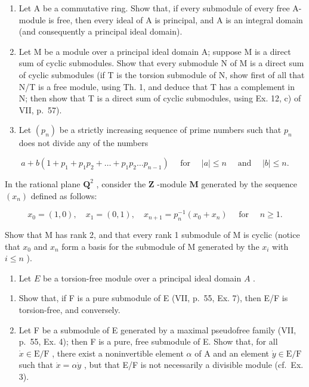 \BourbakiExerciseGroup

\begin{enumerate}
\def\labelenumi{\arabic{enumi})}
\item
  Let A be a commutative ring. Show that, if every submodule of every free A-module is free, then every ideal of A is principal, and A is an integral domain (and consequently a principal ideal domain).
\item
  Let M be a module over a principal ideal domain A; suppose M is a direct sum of cyclic submodules. Show that every submodule N of M is a direct sum of cyclic submodules (if T is the torsion submodule of N, show first of all that N/T is a free module, using Th. 1, and deduce that T has a complement in N; then show that T is a direct sum of cyclic submodules, using Ex. 12, c) of VII, p.~57).
\item
  Let \((p_n)\) be a strictly increasing sequence of prime numbers such that \(p_n\) does not divide any of the numbers
\end{enumerate}

\[
a + b \left(1 + p _ {1} + p _ {1} p _ {2} + \dots + p _ {1} p _ {2} \dots p _ {n - 1}\right) \quad \text { for } \quad | a | \leqslant n \quad \text { and } \quad | b | \leqslant n.
\]

In the rational plane \(\mathbf{Q}^2\) , consider the \(\mathbf{Z}\) -module \(\mathbf{M}\) generated by the sequence \((x_n)\) defined as follows:

\[
x _ {0} = (1, 0), \quad x _ {1} = (0, 1), \quad x _ {n + 1} = p _ {n} ^ {- 1} \left(x _ {0} + x _ {n}\right) \quad \text { for } \quad n \geqslant 1.
\]

Show that M has rank 2, and that every rank 1 submodule of M is cyclic (notice that \(x_{0}\) and \(x_{n}\) form a basis for the submodule of M generated by the \(x_{i}\) with \(i \leqslant n\) ).

\begin{enumerate}
\def\labelenumi{\arabic{enumi})}
\setcounter{enumi}{3}
\tightlist
\item
  Let \(E\) be a torsion-free module over a principal ideal domain \(A\) .
\end{enumerate}

\begin{enumerate}
\def\labelenumi{\alph{enumi})}
\item
  Show that, if F is a pure submodule of E (VII, p.~55, Ex. 7), then E/F is torsion-free, and conversely.
\item
  Let F be a submodule of E generated by a maximal pseudofree family (VII, p.~55, Ex. 4); then F is a pure, free submodule of E. Show that, for all \(\dot{x} \in \mathrm{E} / \mathrm{F}\) , there exist a noninvertible element \(\alpha\) of A and an element \(\dot{y} \in \mathrm{E} / \mathrm{F}\) such that \(\dot{x} = \alpha \dot{y}\) , but that E/F is not necessarily a divisible module (cf.~Ex. 3).
\end{enumerate}

